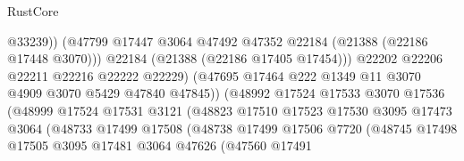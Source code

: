 \begin{lexlean}{RustCore}
\begin{coremodule}
                                        @33239))
                                    (@47799
                                      @17447
                                      @3064
                                      @47492
                                      @47352
                                      @22184
                                      (@21388 (@22186 @17448 @3070)))
                                    @22184
                                    (@21388 (@22186 @17405 @17454)))
                                  @22202
                                  @22206
                                  @22211
                                  @22216
                                  @22222
                                  @22229)
                                (@47695
                                  @17464
                                  @222
                                  @1349
                                  @11
                                  @3070
                                  @4909
                                  @3070
                                  @5429
                                  @47840
                                  @47845))
                              (@48992
                                @17524
                                @17533
                                @3070
                                @17536
                                (@48999
                                  @17524
                                  @17531
                                  @3121
                                  (@48823
                                    @17510
                                    @17523
                                    @17530
                                    @3095
                                    @17473
                                    @3064
                                    (@48733
                                      @17499
                                      @17508
                                      (@48738
                                        @17499
                                        @17506
                                        @7720
                                        (@48745
                                          @17498
                                          @17505
                                          @3095
                                          @17481
                                          @3064
                                          @47626
                                          (@47560
                                            @17491

\end{coremodule}
\end{lexlean}
